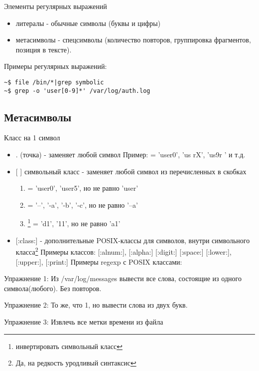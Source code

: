 \begin{frame}[fragile]{Элементы регулярных выражений}
    \begin{itemize}
      \item \alert{литералы} - обычные символы (буквы и цифры) \pause
      \item \alert{метасимволы} - спецсимволы (количество повторов, группировка фрагментов, позиция в тексте).
    \end{itemize} \pause 

    Примеры регулярных выражений:\newline
\begin{lstlisting}
~$ file /bin/*|grep symbolic
~$ grep -o 'user[0-9]*' /var/log/auth.log
\end{lstlisting}
\end{frame}


\subsection{Метасимволы}
\begin{frame}{Класс на 1 символ}
  \begin{itemize}
    \item \alert{.} (точка)  - заменяет любой символ \newline
      Пример:  = 'user0', 'us rX', 'us9r ' и т.д. \pause
    \item \alert{[ ]} символьный класс - заменяет любой символ из перечисленных в скобках
      \begin{enumerate}
	\item {} = 'user0', 'user5', но не равно 'user'
	\item \regex{-[abc-]} = '--', '-a', '-b', '-c', но не равно '--a' 
	\item {}\footnote{инвертировать символьный класс} = 'd1', '11', но не равно 'a1'
      \end{enumerate} \pause
    \item \alert{[:class:]} - дополнительные POSIX-классы для символов, \alert{внутри символьного класса}\footnote{Да, на редкость уродливый синтаксис} \newline
	Примеры классов: \alert{[:alnum:]}, \alert{[:alpha:]} \alert{[:digit:]} \alert{[:space:]} \alert{[:lower:]}, \alert{[:upper:]}, \alert{[:print:]} \newline
	Примеры regexp с POSIX классами: \regex{[ы[:digit:]]}
  \end{itemize} 

  \alert{Упражнение 1}: Из /var/log/messages вывести все слова, состоящие из одного символа(любого). Без повторов.
  
  \alert{Упражнение 2}: То же, что 1, но вывести слова из двух букв.

  \alert{Упражнение 3}: Извлечь все метки времени из файла

\end{frame}


